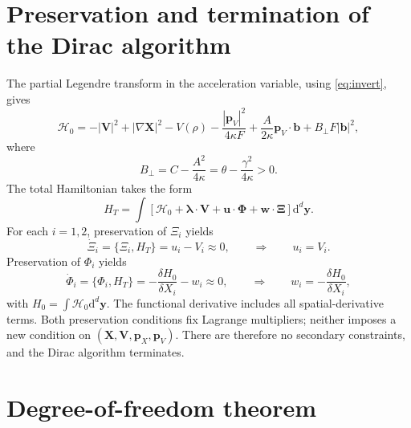 \documentclass[11pt]{article}
\newcommand{\dd}{\mathrm{d}}
\newcommand{\cH}{\mathcal{H}}
\newcommand{\bX}{\mathbf{X}}
\newcommand{\bV}{\mathbf{V}}
\newcommand{\bb}{\mathbf{b}}
\newcommand{\bl}{\boldsymbol{\lambda}}
\newcommand{\bp}{\mathbf{p}}
\begin{document}
\section{Preservation and termination of the Dirac algorithm}

The partial Legendre transform in the acceleration variable, using
\eqref{eq:invert}, gives
\begin{equation}\label{eq:H0}
\boxed{
\cH_0=-|\bV|^2+|\nabla\bX|^2-V(\rho)
-\frac{|\bp_V|^2}{4\kappa F}
+\frac{A}{2\kappa}\bp_V\cdot\bb
+B_\perp F|\bb|^2,}
\end{equation}
where
\begin{equation}
B_\perp=C-\frac{A^2}{4\kappa}
=\theta-\frac{\gamma^2}{4\kappa}>0.
\end{equation}
The total Hamiltonian takes the form
\begin{equation}\label{eq:HT}
H_T=\int\left[\cH_0+\bl\cdot\bV
+\mathbf u\cdot\boldsymbol\Phi
+\mathbf w\cdot\boldsymbol\Xi\right]\dd^d\mathbf y.
\end{equation}
For each $i=1,2$, preservation of $\Xi_i$ yields
\begin{equation}
\dot\Xi_i=\{\Xi_i,H_T\}=u_i-V_i\approx0,
\qquad\Longrightarrow\qquad u_i=V_i.
\end{equation}
Preservation of $\Phi_i$ yields
\begin{equation}
\dot\Phi_i=\{\Phi_i,H_T\}
=-\frac{\delta H_0}{\delta X_i}-w_i\approx0,
\qquad\Longrightarrow\qquad
w_i=-\frac{\delta H_0}{\delta X_i},
\end{equation}
with $H_0=\int\cH_0\dd^d\mathbf y$. The functional derivative
includes all spatial-derivative terms.
Both preservation conditions fix Lagrange multipliers; neither imposes
a new condition on $(\bX,\bV,\bp_X,\bp_V)$. There are therefore
no secondary constraints, and the Dirac algorithm terminates.

\section{Degree-of-freedom theorem}
\end{document}
